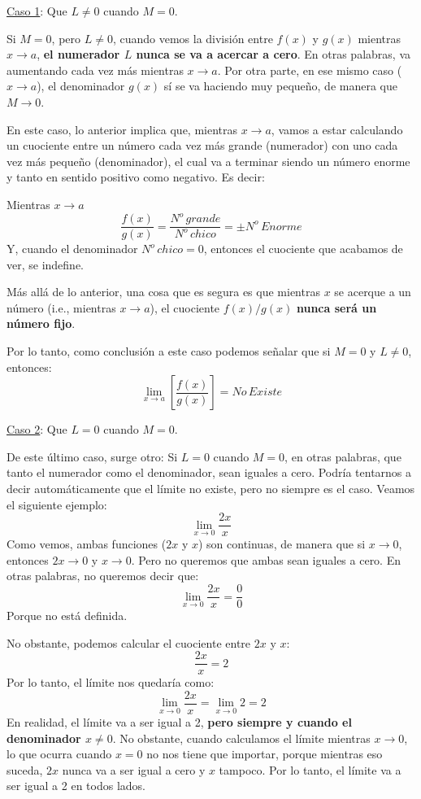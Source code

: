 \documentclass[12pt]{article}
\begin{document}
\underline{Caso 1}: Que $L \neq 0$ cuando $M = 0$.

Si $M = 0$, pero $L \neq 0$, cuando vemos la división entre $f(x)$ y $g(x)$ mientras $x \to a$, \textbf{el numerador $L$ nunca se va a acercar a cero}. En otras palabras, va aumentando cada vez más mientras $x \to a$. Por otra parte, en ese mismo caso ($x \to a$), el denominador $g(x)$ sí se va haciendo muy pequeño, de manera que $M \to 0$.

En este caso, lo anterior implica que, mientras $x \to a$, vamos a estar calculando un cuociente entre un número cada vez más grande (numerador) con uno cada vez más pequeño (denominador), el cual va a terminar siendo un número enorme y tanto en sentido positivo como negativo. Es decir:

Mientras $x \to a$
\[\frac{f(x)}{g(x)} = \frac{N^{o} \, grande}{N^{o} \, chico} = \pm N^{o} \, Enorme\]
Y, cuando el denominador $N^{o} \, chico = 0$, entonces el cuociente que acabamos de ver, se indefine.

Más allá de lo anterior, una cosa que es segura es que mientras $x$ se acerque a un número (i.e., mientras $x \to a$), el cuociente $f(x)/g(x)$ \textbf{nunca será un número fijo}.

Por lo tanto, como conclusión a este caso podemos señalar que si $M = 0$ y $L \neq 0$, entonces:
\[\lim_{x \to a} \left[\frac{f(x)}{g(x)}\right] = No \, Existe\]

\underline{Caso 2}: Que $L = 0$ cuando $M = 0$.

De este último caso, surge otro: Si $L = 0$ cuando $M = 0$, en otras palabras, que tanto el numerador como el denominador, sean iguales a cero. Podría tentarnos a decir automáticamente que el límite no existe, pero no siempre es el caso. Veamos el siguiente ejemplo:
\[\lim_{x \to 0} \frac{2x}{x}\]
Como vemos, ambas funciones ($2x$ y $x$) son continuas, de manera que si $x \to 0$, entonces $2x \to 0$ y $x \to 0$. Pero no queremos que ambas sean iguales a cero. En otras palabras, no queremos decir que:
\[\lim_{x \to 0} \frac{2x}{x} = \frac{0}{0}\]
Porque no está definida.

No obstante, podemos calcular el cuociente entre $2x$ y $x$:
\[\frac{2x}{x} = 2\]
Por lo tanto, el límite nos quedaría como:
\[\lim_{x \to 0} \frac{2x}{x} = \lim_{x \to 0} 2 = 2\]
En realidad, el límite va a ser igual a 2, \textbf{pero siempre y cuando el denominador $x \neq 0$}. No obstante, cuando calculamos el límite mientras $x \to 0$, lo que ocurra cuando $x = 0$ no nos tiene que importar, porque mientras eso suceda, $2x$ nunca va a ser igual a cero y $x$ tampoco. Por lo tanto, el límite va a ser igual a 2 en todos lados.
\end{document}
